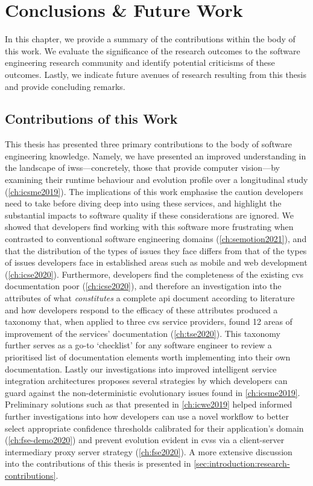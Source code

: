 \chapter{Conclusions \& Future Work}
\label{ch:conclusions}

In this chapter, we provide a summary of the contributions within the body of this work. We evaluate the significance of the research outcomes to the software engineering research community and identify potential criticisms of these outcomes. Lastly, we indicate future avenues of research resulting from this thesis and provide concluding remarks.

\section{Contributions of this Work}

This thesis has presented three primary contributions to the body of software engineering knowledge. Namely, we have presented an improved understanding in the landscape of \glspl{iws}---concretely, those that provide computer vision---by examining their runtime behaviour and evolution profile over a longitudinal study (\cref{ch:icsme2019}). The implications of this work emphasise the caution developers need to take before diving deep into using these services, and highlight the substantial impacts to software quality if these considerations are ignored. We showed that developers find working with this software more frustrating when contrasted to conventional software engineering domains (\cref{ch:semotion2021}), and that the distribution of the types of issues they face differs from that of the types of issues developers face in established areas such as mobile and web development (\cref{ch:icse2020}). Furthermore, developers find the completeness of the existing \gls{cvs}  documentation poor (\cref{ch:icse2020}), and therefore an investigation into the attributes of what \textit{constitutes} a complete \gls{api} document according to literature and how developers respond to the efficacy of these attributes produced a taxonomy that, when applied to three \gls{cvs} service providers, found 12 areas of improvement of the services' documentation (\cref{ch:tse2020}). This taxonomy further serves as a go-to `checklist' for any software engineer to review a prioritised list of documentation elements worth implementing into their own  documentation. Lastly our investigations into improved intelligent service integration architectures proposes several strategies by which developers can guard against the non-deterministic evolutionary issues found in \cref{ch:icsme2019}. Preliminary solutions such as that presented in \cref{ch:icwe2019} helped informed further investigations into how developers can use a novel workflow to better select appropriate confidence thresholds calibrated for their application's domain (\cref{ch:fse-demo2020}) and prevent evolution evident in \glspl{cvs} via a client-server intermediary proxy server strategy (\cref{ch:fse2020}). A more extensive discussion into the contributions of this thesis is presented in \cref{sec:introduction:research-contributions}.

